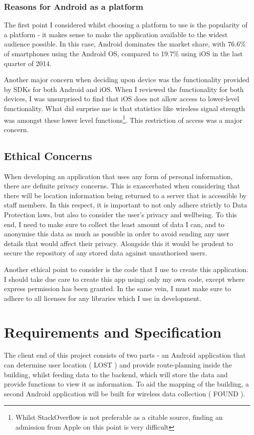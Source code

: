 \documentclass[11pt]{informatics-report}
\begin{document}
\subsection{Reasons for Android as a platform}

The first point I considered whilst choosing a platform to use is the popularity of a platform - it makes sense to make the application available to the widest audience possible. In this case, Android dominates the market share, with 76.6\% of smartphones using the Android OS, compared to 19.7\% using iOS in the last quarter of 2014\cite{devicestats}.

Another major concern when deciding upon device was the functionality provided by SDKs for both Android and iOS. When I reviewed the functionality for both devices, I was unsurprised to find that iOS does not allow access to lower-level functionality. What did surprise me is that statistics like wireless signal strength was amongst these lower level functions\cite{ios1}\cite{ios2}\footnote{Whilst StackOverflow is not preferable as a citable source, finding an admission from Apple on this point is very difficult}. This restriction of access was a major concern.

\section{Ethical Concerns}

When developing an application that uses any form of personal information, there are definite privacy concerns. This is exascerbated when considering that there will be location information being returned to a server that is accessible by staff members. In this respect, it is important to not only adhere strictly to Data Protection laws, but also to consider the user's privacy and wellbeing. To this end, I need to make sure to collect the least amount of data I can, and to anonymise this data as much as possible in order to avoid sending any user details that would affect their privacy. Alongside this it would be prudent to secure the repository of any stored data against unauthorised users.

Another ethical point to consider is the code that I use to create this application. I should take due care to create this app usingi only my own code, except where express permission has been granted. In the same vein, I must make sure to adhere to all licenses for any libraries which I use in development.

\chapter{Requirements and Specification}
The client end of this project consists of two parts - an Android application that can determine user location ( LOST ) and provide route-planning inside the building, whilst feeding data to the backend, which will store the data and provide functions to view it as information. To aid the mapping of the building, a second Android application will be built for wireless data collection ( FOUND ).
\end{document}
